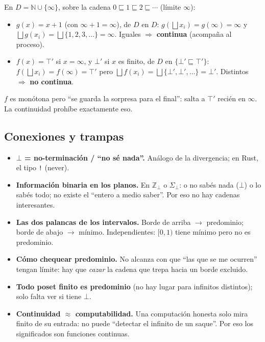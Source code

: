 \begin{example}
En $D=\mathbb{N}\cup\{\infty\}$, sobre la cadena $0\sqsubseteq 1\sqsubseteq 2\sqsubseteq\cdots$
(límite $\infty$):
\begin{itemize}
\item $g(x)=x+1$ (con $\infty+1=\infty$), de $D$ en $D$:
  $g(\bigsqcup x_i)=g(\infty)=\infty$ y $\bigsqcup g(x_i)=\bigsqcup\{1,2,3,\dots\}=\infty$.
  Iguales $\Rightarrow$ \textbf{continua} (acompaña al proceso).
\item $f(x)=\top'$ si $x=\infty$, y $\bot'$ si $x$ es finito, de $D$ en
  $\{\bot' \sqsubseteq \top'\}$: $f(\bigsqcup x_i)=f(\infty)=\top'$ pero
  $\bigsqcup f(x_i)=\bigsqcup\{\bot',\bot',\dots\}=\bot'$. Distintos $\Rightarrow$
  \textbf{no continua}.
\end{itemize}
$f$ es monótona pero ``se guarda la sorpresa para el final'': salta a $\top'$ recién
en $\infty$. La continuidad prohíbe exactamente eso.
\end{example}

\subsection*{Conexiones y trampas}
\begin{itemize}
\item \textbf{$\bot$ = no-terminación / ``no sé nada''.} Análogo de la divergencia;
  en Rust, el tipo \texttt{!} (never).
\item \textbf{Información binaria en los planos.} En $\mathbb{Z}_\bot$ o $\Sigma_\bot$:
  o no sabés nada ($\bot$) o lo sabés todo; no existe el ``entero a medio saber''.
  Por eso no hay cadenas interesantes.
\item \textbf{Las dos palancas de los intervalos.} Borde de arriba $\to$ predominio;
  borde de abajo $\to$ mínimo. Independientes: $[0,1)$ tiene mínimo pero no es predominio.
\item \textbf{Cómo chequear predominio.} No alcanza con que ``las que se me ocurren''
  tengan límite: hay que \emph{cazar} la cadena que trepa hacia un borde excluido.
\item \textbf{Todo poset finito es predominio} (no hay lugar para infinitos distintos);
  solo falta ver si tiene $\bot$.
\item \textbf{Continuidad $\approx$ computabilidad.} Una computación honesta solo mira
  finito de su entrada: no puede ``detectar el infinito de un saque''. Por eso los
  significados son funciones continuas.
\end{itemize}
